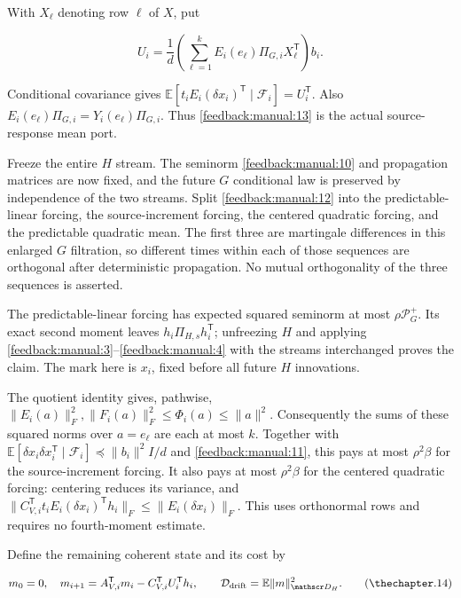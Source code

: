 \documentclass[11pt,oneside,openany,a4paper]{book}
\numberwithin{equation}{chapter}
\theoremstyle{definition}
\theoremstyle{remark}
\begin{document}
With \(X_\ell\) denoting row \(\ell\) of \(X\), put

\[
U_i=\frac1d\left(\sum_{\ell=1}^k E_i(e_\ell)\Pi_{G,i}X_\ell^{\mathsf T}\right)b_i.
\tag{\thechapter.13}\label{feedback:manual:13}
\]

Conditional covariance gives \(\mathbb E[t_iE_i(\delta x_i)^{\mathsf T}\mid\mathcal F_i]=U_i^{\mathsf T}\). Also \(E_i(e_\ell)\Pi_{G,i}=Y_i(e_\ell)\Pi_{G,i}\). Thus \eqref{feedback:manual:13} is the actual source-response mean port.

Freeze the entire \(H\) stream. The seminorm \eqref{feedback:manual:10} and propagation matrices are now fixed, and the future \(G\) conditional law is preserved by independence of the two streams. Split \eqref{feedback:manual:12} into the predictable-linear forcing, the source-increment forcing, the centered quadratic forcing, and the predictable quadratic mean. The first three are martingale differences in this enlarged \(G\) filtration, so different times within each of those sequences are orthogonal after deterministic propagation. No mutual orthogonality of the three sequences is asserted.

The predictable-linear forcing has expected squared seminorm at most \(\rho\mathcal P_G^+\). Its exact second moment leaves \(h_i\Pi_{H,s}h_i^{\mathsf T}\); unfreezing \(H\) and applying \eqref{feedback:manual:3}--\eqref{feedback:manual:4} with the streams interchanged proves the claim. The mark here is \(x_i\), fixed before all future \(H\) innovations.

The quotient identity gives, pathwise, \(\|E_i(a)\|_F^2,\|F_i(a)\|_F^2\le\Phi_i(a)\le\|a\|^2\). Consequently the sums of these squared norms over \(a=e_\ell\) are each at most \(k\). Together with \(\mathbb E[\delta x_i\delta x_i^{\mathsf T}\mid\mathcal F_i]\preceq\|b_i\|^2I/d\) and \eqref{feedback:manual:11}, this pays at most \(\rho^2\beta\) for the source-increment forcing. It also pays at most \(\rho^2\beta\) for the centered quadratic forcing: centering reduces its variance, and \(\|C_{V,i}^{\mathsf T}t_iE_i(\delta x_i)^{\mathsf T}h_i\|_F\le\|E_i(\delta x_i)\|_F\). This uses orthonormal rows and requires no fourth-moment estimate.

Define the remaining coherent state and its cost by

\[
m_0=0,\quad m_{i+1}=A_{V,i}^{\mathsf T}m_i-C_{V,i}^{\mathsf T}U_i^{\mathsf T}h_i,
\qquad \mathcal D_{\rm drift}=\mathbb E\|m\|_{\mathscr D_H}^2.
\tag{\thechapter.14}\label{feedback:manual:14}
\]
\end{document}
